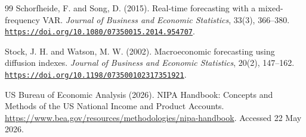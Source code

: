\documentclass[12pt]{article}
\begin{document}
\begin{thebibliography}{99}
Schorfheide, F. and Song, D. (2015).
Real-time forecasting with a mixed-frequency VAR.
\emph{Journal of Business and Economic Statistics}, 33(3), 366--380. \href{https://doi.org/10.1080/07350015.2014.954707}{\nolinkurl{https://doi.org/10.1080/07350015.2014.954707}}.

Stock, J. H. and Watson, M. W. (2002).
Macroeconomic forecasting using diffusion indexes.
\emph{Journal of Business and Economic Statistics}, 20(2), 147--162. \href{https://doi.org/10.1198/073500102317351921}{\nolinkurl{https://doi.org/10.1198/073500102317351921}}.

US Bureau of Economic Analysis (2026).
NIPA Handbook: Concepts and Methods of the US National Income and Product Accounts.
\url{https://www.bea.gov/resources/methodologies/nipa-handbook}. Accessed 22 May 2026.

\end{thebibliography}
\end{document}

